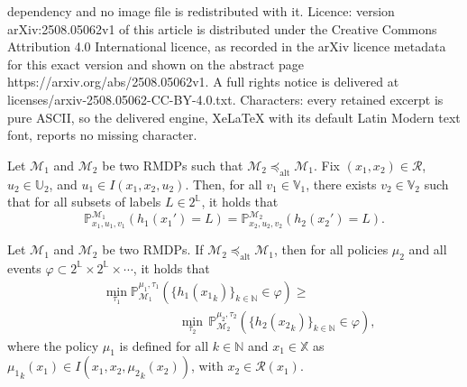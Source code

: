 \documentclass[10pt,a4paper]{amsart}
\newcommand*{\Actions}{\ensuremath{\mathbb{U}}}
\newcommand*{\Disturb}{\ensuremath{\mathbb{V}}}
\newcommand*{\Labels}{\ensuremath{\mathbb{L}}}
\newcommand*{\NN}{\mathbb{N}}
\newcommand*{\Prob}{\mathbb{P}}
\newcommand*{\Relation}{\mathcal{R}}
\newcommand*{\States}{\ensuremath{\mathbb{X}}}
\newcommand*{\adversary}{\ensuremath{\tau}}
\newcommand*{\labelfunc}{\ensuremath{h}}
\newcommand*{\policy}{\ensuremath{\mu}}
\newcommand*{\rmdp}{{\ensuremath{\mathcal{M}}}}
\begin{document}
dependency and no image file is redistributed with it. Licence: version arXiv:2508.05062v1 of this article is distributed under the Creative Commons Attribution 4.0 International licence, as recorded in the arXiv licence metadata for this exact version and shown on the abstract page https://arxiv.org/abs/2508.05062v1. A full rights notice is delivered at licenses/arxiv-2508.05062-CC-BY-4.0.txt. Characters: every retained excerpt is pure ASCII, so the delivered engine, XeLaTeX with its default Latin Modern text font, reports no missing character.
\begin{lemma}
    \label{lemma:observations}
    Let $\rmdp_1$ and $\rmdp_2$ be two RMDPs such that $\rmdp_2 \preceq_\text{alt} \rmdp_1$.
    Fix $(x_1, x_2) \in \Relation$, $u_2 \in \Actions_2$, and $u_1 \in I(x_1, x_2, u_2)$.
    Then, for all $v_1 \in \Disturb_1$, there exists $v_2 \in \Disturb_2$ such that for all subsets of labels $L \in 2^\Labels$, it holds that
    \begin{equation}
        \label{eq:lemma_observation}
        \Prob^{\rmdp_1}_{x_1,u_1,v_1}(h_1(x_1') = L) = 
        \Prob^{\rmdp_2}_{x_2,u_2,v_2}(h_2(x_2') = L).
    \end{equation}
\end{lemma}

\begin{theorem}
    \label{thm:PASR_synthesis}
    Let $\rmdp_1$ and $\rmdp_2$ be two RMDPs.
    If $\rmdp_2 \preceq_\text{alt} \rmdp_1$, then for all policies $\policy_2$ and all events $\varphi \subset 2^\Labels \times 2^\Labels \times \cdots$, it holds that
    \begin{equation}
    \begin{split}
        \label{eq:PASR_synthesis}
        &\min_{\adversary_1} \Prob_{\rmdp_1}^{\policy_1, \adversary_1}\left( \{\labelfunc_1({x_1}_k)\}_{k \in \NN} \in \varphi \right) \geq \\
        &\qquad\qquad\qquad\min_{\adversary_2} \,\Prob_{\rmdp_2}^{\policy_2, \adversary_2}\left( \{\labelfunc_2({x_2}_k)\}_{k \in \NN} \in \varphi \right),
    \end{split}
    \end{equation}
    where the policy $\policy_1$ is defined for all $k \in \NN$ and $x_1 \in \States$ as ${\policy_1}_k(x_1) \in I(x_1, x_2, {\policy_2}_k(x_2))$, with 
    $x_2 \in \Relation(x_1)$.
\end{theorem}
\end{document}
